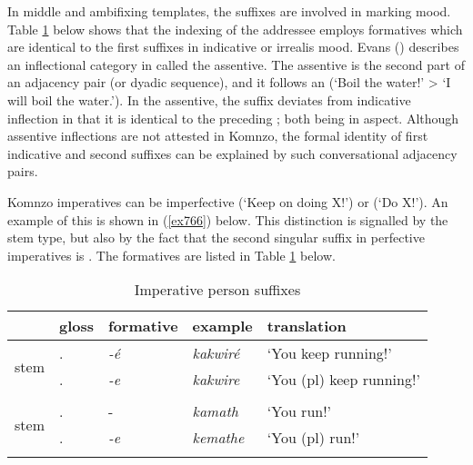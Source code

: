 In middle and ambifixing templates, the  suffixes are involved in marking  mood. Table \ref{perssuffimp} below shows that the indexing of the addressee employs formatives which are identical to the first  suffixes in indicative or irrealis mood. Evans (\citeyear{Evans:2012ue}) describes an inflectional category in  called the assentive. The assentive is the second part of an adjacency pair (or dyadic sequence), and it follows an  (`Boil the water!' > `I will boil the water.'). In the assentive, the  suffix deviates from indicative inflection in that it is identical to the preceding ; both being  in  aspect. Although assentive inflections are not attested in Komnzo, the formal identity of first  indicative and second   suffixes can be explained by such conversational adjacency pairs.%

Komnzo imperatives can be imperfective (`Keep on doing X!') or  (`Do X!'). An example of this is shown in (\ref{ex766}) below. This distinction is signalled by the stem type, but also by the fact that the second singular suffix in perfective imperatives is . The formatives are listed in Table \ref{perssuffimp} below.

\begin{table}
\caption{Imperative person suffixes}
\label{perssuffimp}
	\begin{tabularx}{\textwidth}{XXXXl}
		\lsptoprule
		&{gloss} &{formative} &{example} &{translation}\\\midrule
		\multirow{2}{*}{\Ext{} stem} &\Ssg.\Imp &\emph{-é}	&\emph{kakwiré} &`You keep running!'\\
		&\Snsg.\Imp	&\emph{-e} &\emph{kakwire} &`You (pl) keep running!'\\
		&&&&\\
		\multirow{2}{*}{\Rs{} stem} &\Ssg.\Imp &-\Zero &\emph{kamath} &`You run!'\\
		&\Snsg.\Imp	&\emph{-e} &\emph{kemathe} &`You (pl) run!'\\
		\lspbottomrule
	\end{tabularx}
\end{table}%

